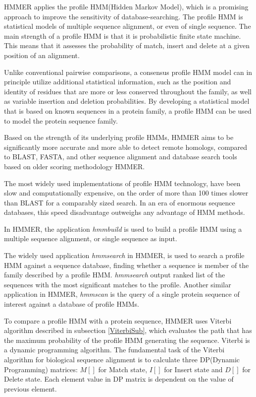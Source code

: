 HMMER applies the profile HMM(Hidden Markov Model), which is a promising approach to improve the sensitivity of database-searching. The profile HMM is statistical models of multiple sequence alignment, or even of single sequence. The main strength of a profile HMM is that it is probabilistic finite state machine. This means that it assesses the probability of match, insert and delete at a given position of an alignment.

Unlike conventional pairwise comparisons, a consensus profile HMM model can in principle utilize additional statistical information, such as the position and identity of residues that are more or less conserved throughout the family, as well as variable insertion and deletion probabilities. By developing a statistical model that is based on known sequences in a protein family, a profile HMM can be used to model the protein sequence family.

Based on the strength of its underlying profile HMMs, HMMER aims to be significantly more accurate and more able to detect remote homologs, compared to BLAST, FASTA, and other sequence alignment and database search tools based on older scoring methodology {HMMER}.

The most widely used implementations of profile HMM technology, have been slow and computationally expensive, on the order of more than 100 times slower than BLAST for a comparably sized search. In an era of enormous sequence databases, this speed disadvantage outweighs any advantage of HMM methods.



In HMMER, the application \emph{hmmbuild} is used to build a profile HMM using a multiple sequence alignment, or single sequence as input. 

The widely used application \emph{hmmsearch} in HMMER, is used to search a profile HMM against a sequence database, finding whether a sequence is member of the family described by a profile HMM. \emph{hmmsearch} output ranked list of the sequences with the most significant matches to the profile. Another similar application in HMMER, \emph{hmmscan} is the query of a single protein sequence of interest against a database of profile HMMs.

To compare a profile HMM with a protein sequence, HMMER uses Viterbi algorithm described in subsection \ref{ViterbiSub}, which evaluates the path that has the maximum probability of the profile HMM generating the sequence. Viterbi is a dynamic programming algorithm.
The fundamental task of the Viterbi algorithm for biological sequence alignment is to calculate three DP(Dynamic Programming) matrices: $M[{ }]$ for Match state, $I[{ }]$ for Insert state and $D[{ }]$ for Delete state. Each element value in DP matrix is dependent on the value of previous element.

